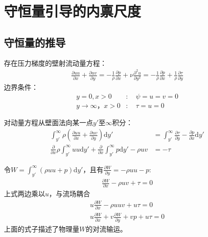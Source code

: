 \section{守恒量引导的内禀尺度}
\subsection{守恒量的推导}
存在压力梯度的壁射流动量方程：
\begin{align}
    \frac{\partial uu}{\partial x}+\frac{\partial uv}{\partial y}=-\frac{1}{\rho}\frac{\partial p}{\partial x}+\nu\frac{\partial^{2} u}{\partial y^{2}}=-\frac{1}{\rho}\frac{\partial p}{\partial x}+\frac{1}{\rho}\frac{\partial\tau}{\partial y}
\end{align}
边界条件：
\begin{align}
    y=0,x>0&:\quad \psi=u=v=0\\
    y\rightarrow \infty，x>0&: \quad \tau=u=0
\end{align}

对动量方程从壁面法向某一点$y'$至$\infty$积分：
\begin{align}
    \int_{y'}^{\infty}\rho(\frac{\partial uu}{\partial x}+\frac{\partial uv}{\partial y})\mathrm{d}y'&=\int_{y'}^{\infty}\frac{\partial\tau}{\partial y}-\frac{\partial p}{\partial x}\mathrm{d}y'\\
    \frac{\partial}{\partial x}\rho\int_{y'}^{\infty}uu\mathrm{d}y'+\frac{\partial }{\partial x}\int_{y'}^{\infty}p\mathrm{d}y'-\rho uv&=-\tau
\end{align}

令$W=\int_{y'}^{\infty}(\rho uu+p)\mathrm{d}y'$，且有$\frac{\partial W}{\partial y}=-\rho uu-p$:
\begin{align}
    \frac{\partial W}{\partial x}-\rho uv+\tau=0
\end{align}
上式两边乘以$u$，与流场耦合
\begin{align}
     u\frac{\partial W}{\partial x}-\rho uuv+u\tau=0\\
     u\frac{\partial W}{\partial x}+v\frac{\partial W}{\partial y}+vp+u\tau=0
\end{align}
上面的式子描述了物理量$W$的对流输运。


